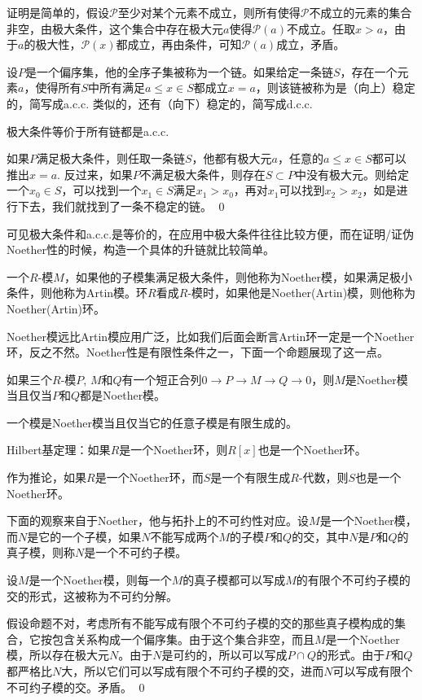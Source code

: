 证明是简单的，假设$\mathcal{P}$至少对某个元素不成立，则所有使得$\mathcal{P}$不成立的元素的集合非空，由极大条件，这个集合中存在极大元$a$使得$\mathcal{P}(a)$不成立。任取$x>a$，由于$a$的极大性，$\mathcal{P}(x)$都成立，再由条件，可知$\mathcal{P}(a)$成立，矛盾。

\para 设$P$是一个偏序集，他的全序子集被称为一个链。如果给定一条链$S$，存在一个元素$a$，使得所有$S$中所有满足$a\leq x\in S$都成立$x=a$，则该链被称为是（向上）稳定的，简写成a.c.c. 类似的，还有（向下）稳定的，简写成d.c.c.

\pro 极大条件等价于所有链都是a.c.c.

\proof
	如果$P$满足极大条件，则任取一条链$S$，他都有极大元$a$，任意的$a\leq x\in S$都可以推出$x=a$. 反过来，如果$P$不满足极大条件，则存在$S\subset P$中没有极大元。则给定一个$x_0\in S$，可以找到一个$x_1\in S$满足$x_1>x_0$，再对$x_1$可以找到$x_2>x_2$，如是进行下去，我们就找到了一条不稳定的链。
\qed

可见极大条件和a.c.c.是等价的，在应用中极大条件往往比较方便，而在证明/证伪Noether性的时候，构造一个具体的升链就比较简单。

\para 一个$R$-模$M$，如果他的子模集满足极大条件，则他称为Noether模，如果满足极小条件，则他称为Artin模。环$R$看成$R$-模时，如果他是Noether(Artin)模，则他称为Noether(Artin)环。

Noether模远比Artin模应用广泛，比如我们后面会断言Artin环一定是一个Noether环，反之不然。Noether性是有限性条件之一，下面一个命题展现了这一点。

\pro 如果三个$R$-模$P$, $M$和$Q$有一个短正合列$0\to P\to M\to Q\to 0$，则$M$是Noether模当且仅当$P$和$Q$都是Noether模。\notprove

\pro 一个模是Noether模当且仅当它的任意子模是有限生成的。\notprove

\theo Hilbert基定理：如果$R$是一个Noether环，则$R[x]$也是一个Noether环。\notprove

作为推论，如果$R$是一个Noether环，而$S$是一个有限生成$R$-代数，则$S$也是一个Noether环。

\para 下面的观察来自于Noether，他与拓扑上的不可约性对应。设$M$是一个Noether模，而$N$是它的一个子模，如果$N$不能写成两个$M$的子模$P$和$Q$的交，其中$N$是$P$和$Q$的真子模，则称$N$是一个不可约子模。

\pro \label{irrde}设$M$是一个Noether模，则每一个$M$的真子模都可以写成$M$的有限个不可约子模的交的形式，这被称为不可约分解。

\proof
	假设命题不对，考虑所有不能写成有限个不可约子模的交的那些真子模构成的集合，它按包含关系构成一个偏序集。由于这个集合非空，而且$M$是一个Noether模，所以存在极大元$N$。由于$N$是可约的，所以可以写成$P\cap Q$的形式。由于$P$和$Q$都严格比$N$大，所以它们可以写成有限个不可约子模的交，进而$N$可以写成有限个不可约子模的交。矛盾。
\qed

